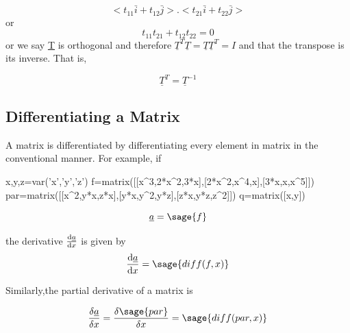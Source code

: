 \documentclass[12pt]{report}
\begin{document}
\begin{equation}
	<{t}_{11} \bar{i} + {t}_{12} \bar{j}>.<{t}_{21} \bar{i} +
	{t}_{22} \bar{j}>
\end{equation}
or 
\begin{equation}
		{t}_{11}{t}_{21} + {t}_{12} {t}_{22}=0
\end{equation}
or we say \underline{T} is orthogonal and 
therefore $\underline{T}^T\underline{T}=\underline{T}\underline{T}^T=I$ 
and that the transpose is its inverse. That is,

\begin{equation}
	\underline{T}^T=\underline{T}^{-1}
\end{equation}


\subsection{Differentiating a Matrix}

A matrix is differentiated by differentiating
 every element in matrix in the conventional 
manner. For example, if

\begin{sagesilent}
	x,y,z=var('x','y','z')
	f=matrix([[x^3,2*x^2,3*x],[2*x^2,x^4,x],[3*x,x,x^5]])
	par=matrix([[x^2,y*x,z*x],[y*x,y^2,y*z],[z*x,y*z,z^2]])
	q=matrix([x,y])
\end{sagesilent}

\begin{equation}
	\underline{a}= \sage{f}
\end{equation}

the derivative $\frac{{\rm d}\underline{a}}{{\rm d}x}$ 
is given by 
\begin{equation} 
	\frac{{\rm d}\underline{a}}{{\rm d}x} = \sage{diff(f,x)}
\end{equation}

Similarly,the partial derivative of a matrix is 

\begin{equation} 
	\frac{\delta\underline{a}}{\delta x}= \frac{\delta \sage{par} }{\delta x} = \sage{diff(par,x)} 
\end{equation}
\end{document}
